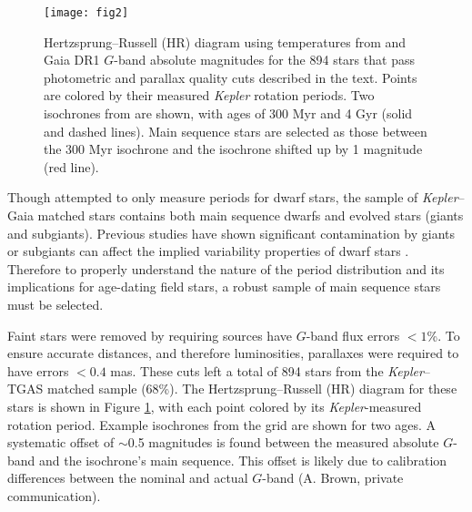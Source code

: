 \documentclass[manuscript, letterpaper]{aastex6}
\makeatletter
\let\origsection\section
\renewcommand\section{\@ifstar{\starsection}{\nostarsection}}
\newcommand\nostarsection[1]{\sectionprelude\origsection{#1}}
\newcommand\starsection[1]{\sectionprelude\origsection*{#1}}
\newcommand\sectionprelude{\vspace{1em}}
\newcommand{\Kepler}{\textsl{Kepler}\xspace}
\makeatother
\begin{document}
\begin{figure}[]
\centering
\texttt{[image: fig2]}
\caption{Hertzsprung--Russell (HR) diagram using temperatures from \citet{mcquillan2014} and Gaia DR1 $G$-band absolute magnitudes for the 894 stars that pass photometric and parallax quality cuts described in the text. Points are colored by their measured \Kepler rotation periods. Two isochrones from \citet{bressan2012} are shown, with ages of 300 Myr and 4 Gyr (solid and dashed lines). Main sequence stars are selected as those between the 300 Myr isochrone and the isochrone shifted up by 1 magnitude (red line).
}
\label{fig:HR}
\end{figure}

\section{Selecting Main Sequence Stars}


Though \citet{mcquillan2014} attempted to only measure periods for dwarf stars, the sample of \Kepler--Gaia matched stars contains both main sequence dwarfs and evolved stars (giants and subgiants). Previous studies have shown  significant contamination by giants or subgiants can affect the implied variability properties of dwarf stars \citep{ciardi2011,mann2012}. Therefore to properly understand the nature of the period distribution and its implications for age-dating field stars, a robust sample of main sequence stars must be selected.

Faint stars were removed by requiring sources have $G$-band flux errors $<1$\%. To ensure accurate distances, and therefore luminosities, parallaxes were required to have errors $<0.4$ mas. These cuts left a total of 894 stars from the \Kepler--TGAS matched sample (68\%). The Hertzsprung--Russell (HR) diagram for these stars is shown in Figure \ref{fig:HR}, with each point colored by its \Kepler-measured rotation period. Example isochrones from the \citet{bressan2012} grid are shown for two ages. A systematic offset of $\sim$0.5 magnitudes is found between the measured absolute $G$-band and the isochrone's main sequence. This offset is likely due to calibration differences between the nominal and actual $G$-band (A. Brown, private communication).
\end{document}

